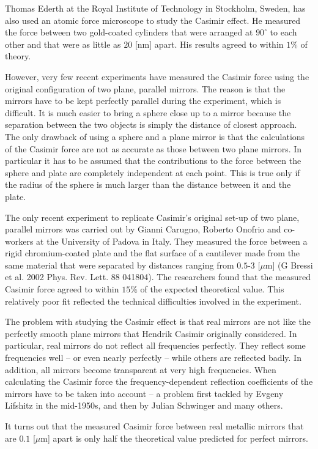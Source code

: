 	Thomas Ederth at the Royal Institute of Technology in Stockholm, Sweden, has also used an atomic force microscope to study the Casimir effect. He measured the force between two gold-coated cylinders that were arranged at $90^\circ$ to each other and that were as little as $20$ [nm] apart. His results agreed to within $1\%$ of theory.
	
	However, very few recent experiments have measured the Casimir force using the original configuration of two plane, parallel mirrors. The reason is that the mirrors have to be kept perfectly parallel during the experiment, which is difficult. It is much easier to bring a sphere close up to a mirror because the separation between the two objects is simply the distance of closest approach. The only drawback of using a sphere and a plane mirror is that the calculations of the Casimir force are not as accurate as those between two plane mirrors. In particular it has to be assumed that the contributions to the force between the sphere and plate are completely independent at each point. This is true only if the radius of the sphere is much larger than the distance between it and the plate.

	The only recent experiment to replicate Casimir’s original set-up of two plane, parallel mirrors was carried out by Gianni Carugno, Roberto Onofrio and co-workers at the University of Padova in Italy. They measured the force between a rigid chromium-coated plate and the flat surface of a cantilever made from the same material that were separated by distances ranging from $0.5$-$3$ [$\mu$m] (G Bressi et al. 2002 Phys. Rev. Lett. 88 041804). The researchers found that the measured Casimir force agreed to within $15\%$ of the expected theoretical value. This relatively poor fit reflected the technical difficulties involved in the experiment.
	
	The problem with studying the Casimir effect is that real mirrors are not like the perfectly smooth plane mirrors that Hendrik Casimir originally considered. In particular, real mirrors do not reflect all frequencies perfectly. They reflect some frequencies well – or even nearly perfectly – while others are reflected badly. In addition, all mirrors become transparent at very high frequencies. When calculating the Casimir force the frequency-dependent reflection coefficients of the mirrors have to be taken into account – a problem first tackled by Evgeny Lifshitz in the mid-1950s, and then by Julian Schwinger and many others.

	It turns out that the measured Casimir force between real metallic mirrors that are $0.1$ [$\mu$m] apart is only half the theoretical value predicted for perfect mirrors. 
	

